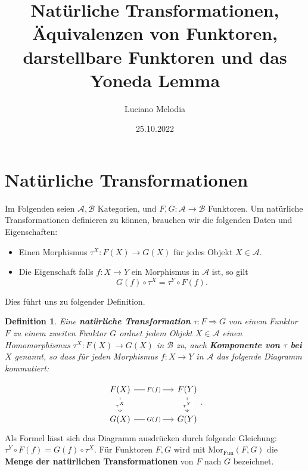 \documentclass{article}
\title{Natürliche Transformationen, Äquivalenzen von Funktoren, darstellbare Funktoren und das Yoneda Lemma}
\author{Luciano Melodia}
\date{25.10.2022}
\newtheorem{definition}{Definition}[section]
\begin{document}
\maketitle

\begin{abstract}
    
\end{abstract}
\section{Natürliche Transformationen}
Im Folgenden seien $\mathcal{A},\mathcal{B}$ Kategorien, und $F,G: \mathcal{A} \rightarrow \mathcal{B}$ Funktoren. Um natürliche Transformationen definieren zu können, brauchen wir die folgenden Daten und Eigenschaften:
\begin{itemize}
	\item Einen Morphismus $\tau^{X}: F(X) \rightarrow G(X)$ für jedes Objekt $X \in \mathcal{A}$.
	\item Die Eigenschaft falls $f: X \rightarrow Y$ ein Morphismus in $\mathcal{A}$ ist, so gilt
	\begin{equation}
		G(f) \circ \tau^{X} = \tau^{Y} \circ F(f).
	\end{equation}
\end{itemize}
Dies führt uns zu folgender Definition.

\begin{definition}
Eine \textbf{natürliche Transformation} $\tau: F \Longrightarrow G$ von einem Funktor $F$ zu einem zweiten Funktor $G$ ordnet jedem Objekt $X \in \mathcal{A}$ einen Homomorphismus $\tau^{X}: F(X) \rightarrow G(X)$ in $\mathcal{B}$ zu, auch \textbf{Komponente von $\tau$ bei $X$} genannt, so dass für jeden Morphismus $f: X \rightarrow Y$ in $\mathcal{A}$ das folgende Diagramm kommutiert:
\end{definition}
\begin{equation}
	\begin{tikzcd}
	F(X) \arrow[rr, "F(f)" description] \arrow[d, "\tau^{X}" description] &  & F(Y) \arrow[d, "\tau^{Y}" description] \\
	G(X) \arrow[rr, "G(f)" description]                                   &  & G(Y)                                  
	\end{tikzcd}.
\end{equation}
Als Formel lässt sich das Diagramm ausdrücken durch folgende Gleichung: $\tau^{Y} \circ F(f) = G(f) \circ \tau^{X}$. Für Funktoren $F,G$ wird mit $\text{Mor}_{\text{Fun}}(F,G)$ die \textbf{Menge der natürlichen Transformationen} von $F$ nach $G$ bezeichnet.
\end{document}
